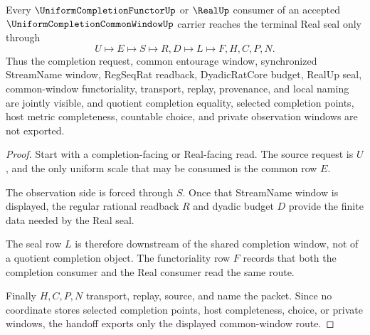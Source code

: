 \begin{theorem}
\label{thm:uniform-completion-common-window-real-seal-handoff}
Every $\UniformCompletionFunctorUp$ or $\RealUp$ consumer of an accepted $\UniformCompletionCommonWindowUp$ carrier reaches the terminal Real seal only through
$$
U \longmapsto E \longmapsto S \longmapsto R,D \longmapsto L \longmapsto F,H,C,P,N .
$$
Thus the completion request, common entourage window, synchronized StreamName window, RegSeqRat readback, DyadicRatCore budget, RealUp seal, common-window functoriality, transport, replay, provenance, and local naming are jointly visible, and quotient completion equality, selected completion points, host metric completeness, countable choice, and private observation windows are not exported.
\end{theorem}
\begin{proof}
Start with a completion-facing or Real-facing read. The source request is $U$, and the only uniform scale that may be consumed is the common row $E$.

The observation side is forced through $S$. Once that StreamName window is displayed, the regular rational readback $R$ and dyadic budget $D$ provide the finite data needed by the Real seal.

The seal row $L$ is therefore downstream of the shared completion window, not of a quotient completion object. The functoriality row $F$ records that both the completion consumer and the Real consumer read the same route.

Finally $H,C,P,N$ transport, replay, source, and name the packet. Since no coordinate stores selected completion points, host completeness, choice, or private windows, the handoff exports only the displayed common-window route.
\end{proof}


